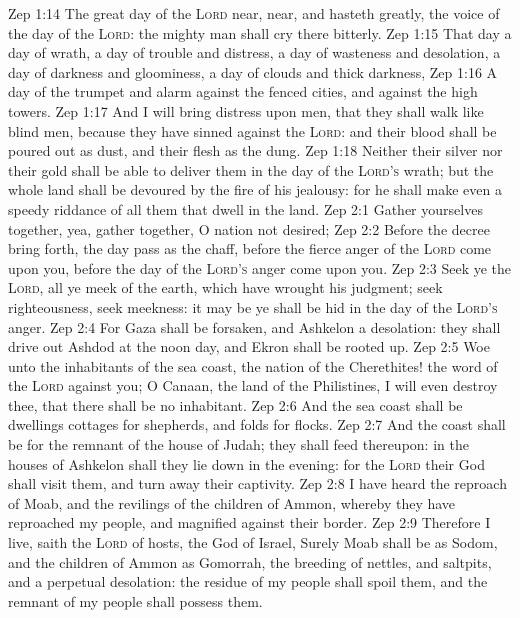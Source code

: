 \vs Zep 1:14 The great day of the \textsc{Lord}  near,  near, and hasteth greatly,  the voice of the day of the \textsc{Lord}: the mighty man shall cry there bitterly.
\vs Zep 1:15 That day  a day of wrath, a day of trouble and distress, a day of wasteness and desolation, a day of darkness and gloominess, a day of clouds and thick darkness,
\vs Zep 1:16 A day of the trumpet and alarm against the fenced cities, and against the high towers.
\vs Zep 1:17 And I will bring distress upon men, that they shall walk like blind men, because they have sinned against the \textsc{Lord}: and their blood shall be poured out as dust, and their flesh as the dung.
\vs Zep 1:18 Neither their silver nor their gold shall be able to deliver them in the day of the \textsc{Lord's} wrath; but the whole land shall be devoured by the fire of his jealousy: for he shall make even a speedy riddance of all them that dwell in the land.
\vs Zep 2:1 Gather yourselves together, yea, gather together, O nation not desired;
\vs Zep 2:2 Before the decree bring forth,  the day pass as the chaff, before the fierce anger of the \textsc{Lord} come upon you, before the day of the \textsc{Lord's} anger come upon you.
\vs Zep 2:3 Seek ye the \textsc{Lord}, all ye meek of the earth, which have wrought his judgment; seek righteousness, seek meekness: it may be ye shall be hid in the day of the \textsc{Lord's} anger.
\vs Zep 2:4 For Gaza shall be forsaken, and Ashkelon a desolation: they shall drive out Ashdod at the noon day, and Ekron shall be rooted up.
\vs Zep 2:5 Woe unto the inhabitants of the sea coast, the nation of the Cherethites! the word of the \textsc{Lord}  against you; O Canaan, the land of the Philistines, I will even destroy thee, that there shall be no inhabitant.
\vs Zep 2:6 And the sea coast shall be dwellings  cottages for shepherds, and folds for flocks.
\vs Zep 2:7 And the coast shall be for the remnant of the house of Judah; they shall feed thereupon: in the houses of Ashkelon shall they lie down in the evening: for the \textsc{Lord} their God shall visit them, and turn away their captivity.
\vs Zep 2:8 I have heard the reproach of Moab, and the revilings of the children of Ammon, whereby they have reproached my people, and magnified  against their border.
\vs Zep 2:9 Therefore  I live, saith the \textsc{Lord} of hosts, the God of Israel, Surely Moab shall be as Sodom, and the children of Ammon as Gomorrah,  the breeding of nettles, and saltpits, and a perpetual desolation: the residue of my people shall spoil them, and the remnant of my people shall possess them.
